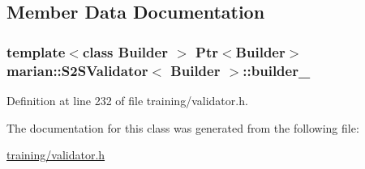 \subsection{Member Data Documentation}
\subsubsection[{\texorpdfstring{builder\+\_\+}{builder_}}]{\setlength{\rightskip}{0pt plus 5cm}template$<$class Builder $>$ {\bf Ptr}$<$Builder$>$ {\bf marian\+::\+S2\+S\+Validator}$<$ Builder $>$\+::builder\+\_\+\hspace{0.3cm}{\ttfamily [private]}}\hypertarget{classmarian_1_1S2SValidator_addec49567df7b879e4a698cb237ca64d}{}\label{classmarian_1_1S2SValidator_addec49567df7b879e4a698cb237ca64d}


Definition at line 232 of file training/validator.\+h.



The documentation for this class was generated from the following file\+:\begin{DoxyCompactItemize}
\item 
\hyperlink{training_2validator_8h}{training/validator.\+h}\end{DoxyCompactItemize}
